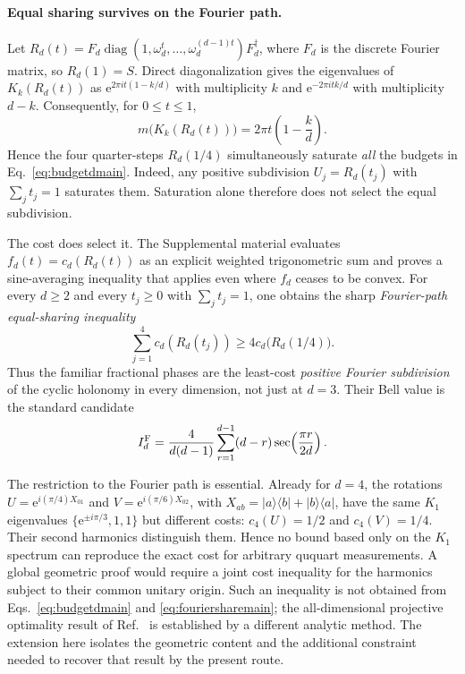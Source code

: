 \documentclass[aps,prl,reprint,superscriptaddress,nofootinbib]{revtex4-2}
\newcommand{\diag}{\operatorname{diag}}
\newcommand{\e}{\mathrm{e}}
\newcommand{\ket}[1]{\lvert #1\rangle}
\newcommand{\bra}[1]{\langle #1\rvert}
\begin{document}
\paragraph{Equal sharing survives on the Fourier path.}
Let $R_d(t)=F_d\diag(1,\omega_d^t,\ldots,\omega_d^{(d-1)t})F_d^\dagger$, where $F_d$ is the discrete Fourier matrix, so $R_d(1)=S$. Direct diagonalization gives the eigenvalues of $K_k(R_d(t))$ as $\e^{2\pi it(1-k/d)}$ with multiplicity $k$ and $\e^{-2\pi itk/d}$ with multiplicity $d-k$. Consequently, for $0\leq t\leq1$,
\begin{equation}
m\bigl(K_k(R_d(t))\bigr)=
2\pi t\left(1-\frac{k}{d}\right).
\label{eq:mFouriermain}
\end{equation}
Hence the four quarter-steps $R_d(1/4)$ simultaneously saturate \emph{all} the budgets in Eq.~\eqref{eq:budgetdmain}. Indeed, any positive subdivision $U_j=R_d(t_j)$ with $\sum_jt_j=1$ saturates them. Saturation alone therefore does not select the equal subdivision.

The cost does select it. The Supplemental material evaluates $f_d(t)=c_d(R_d(t))$ as an explicit weighted trigonometric sum and proves a sine-averaging inequality that applies even where $f_d$ ceases to be convex. For every $d\geq2$ and every $t_j\geq0$ with $\sum_jt_j=1$, one obtains the sharp \emph{Fourier-path equal-sharing inequality}
\begin{equation}
\sum_{j=1}^{4}c_d(R_d(t_j))\geq
4c_d\bigl(R_d(1/4)\bigr).
\label{eq:fouriersharemain}
\end{equation}
Thus the familiar fractional phases are the least-cost \emph{positive Fourier subdivision} of the cyclic holonomy in every dimension, not just at $d=3$. Their Bell value is the standard candidate
\begin{equation}
I_d^{\rm F}=\frac{4}{d(d-1)}\sum_{r=1}^{d-1}
(d-r)\sec\!\left(\frac{\pi r}{2d}\right).
\label{eq:IdFmain}
\end{equation}

The restriction to the Fourier path is essential. Already for $d=4$, the rotations $U=\e^{i(\pi/4)X_{01}}$ and $V=\e^{i(\pi/6)X_{02}}$, with $X_{ab}=\ket a\bra b+\ket b\bra a$, have the same $K_1$ eigenvalues $\{\e^{\pm i\pi/3},1,1\}$ but different costs: $c_4(U)=1/2$ and $c_4(V)=1/4$. Their second harmonics distinguish them. Hence no bound based only on the $K_1$ spectrum can reproduce the exact cost for arbitrary ququart measurements. A global geometric proof would require a joint cost inequality for the harmonics subject to their common unitary origin. Such an inequality is not obtained from Eqs.~\eqref{eq:budgetdmain} and \eqref{eq:fouriersharemain}; the all-dimensional projective optimality result of Ref.~\cite{TurtureanBao} is established by a different analytic method. The extension here isolates the geometric content and the additional constraint needed to recover that result by the present route.
\end{document}
